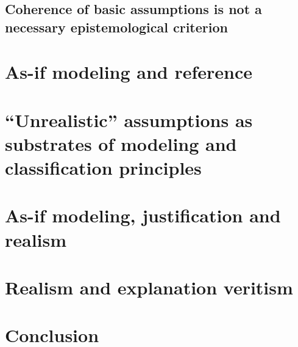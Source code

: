 \documentclass[a4paper,11pt]{article}
\begin{document}
\subsection{Coherence of basic assumptions is not a necessary epistemological criterion}

\section{As-if modeling and reference}

\section{``Unrealistic'' assumptions as substrates of modeling and classification principles}

\section{As-if modeling, justification and realism}

\section{Realism and explanation veritism}

\section{Conclusion}

 

\end{document}
